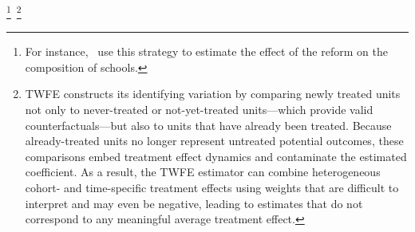 \footnote{For instance,~\cite{urzua2023} use this strategy to estimate the effect of the reform on the composition of schools.}~\citep{borusyak2018, dechaisemartin2020, goodmanbacon2021, sun2021}\footnote{TWFE constructs its identifying variation by comparing newly treated units not only to never-treated or not-yet-treated units—which provide valid counterfactuals—but also to units that have already been treated. Because already-treated units no longer represent untreated potential outcomes, these comparisons embed treatment effect dynamics and contaminate the estimated coefficient. As a result, the TWFE estimator can combine heterogeneous cohort- and time-specific treatment effects using weights that are difficult to interpret and may even be negative, leading to estimates that do not correspond to any meaningful average treatment effect.}

